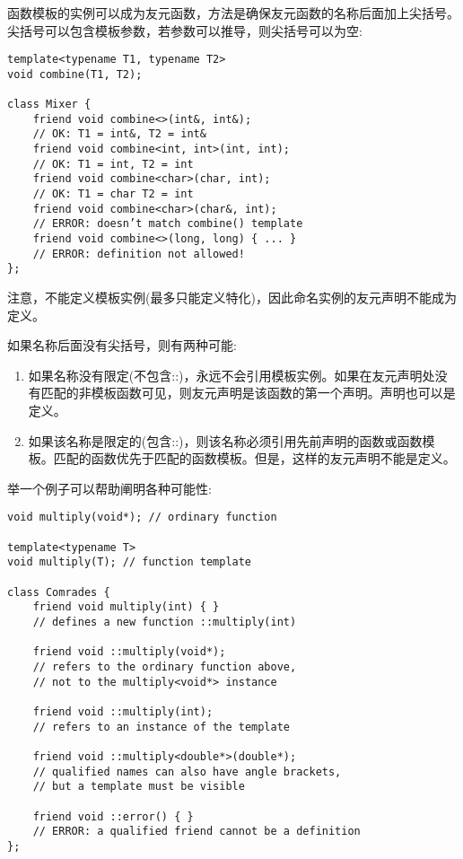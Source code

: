 函数模板的实例可以成为友元函数，方法是确保友元函数的名称后面加上尖括号。尖括号可以包含模板参数，若参数可以推导，则尖括号可以为空:

\begin{lstlisting}[style=styleCXX]
template<typename T1, typename T2>
void combine(T1, T2);

class Mixer {
	friend void combine<>(int&, int&);
	// OK: T1 = int&, T2 = int&
	friend void combine<int, int>(int, int);
	// OK: T1 = int, T2 = int
	friend void combine<char>(char, int);
	// OK: T1 = char T2 = int
	friend void combine<char>(char&, int);
	// ERROR: doesn’t match combine() template
	friend void combine<>(long, long) { ... }
	// ERROR: definition not allowed!
};
\end{lstlisting}

注意，不能定义模板实例(最多只能定义特化)，因此命名实例的友元声明不能成为定义。

如果名称后面没有尖括号，则有两种可能:

\begin{enumerate}
\item 
如果名称没有限定(不包含::)，永远不会引用模板实例。如果在友元声明处没有匹配的非模板函数可见，则友元声明是该函数的第一个声明。声明也可以是定义。

\item 
如果该名称是限定的(包含::)，则该名称必须引用先前声明的函数或函数模板。匹配的函数优先于匹配的函数模板。但是，这样的友元声明不能是定义。
\end{enumerate}

举一个例子可以帮助阐明各种可能性:

\begin{lstlisting}[style=styleCXX]
void multiply(void*); // ordinary function

template<typename T>
void multiply(T); // function template

class Comrades {
	friend void multiply(int) { }
	// defines a new function ::multiply(int)
	
	friend void ::multiply(void*);
	// refers to the ordinary function above,
	// not to the multiply<void*> instance
	
	friend void ::multiply(int);
	// refers to an instance of the template
	
	friend void ::multiply<double*>(double*);
	// qualified names can also have angle brackets,
	// but a template must be visible
	
	friend void ::error() { }
	// ERROR: a qualified friend cannot be a definition
};
\end{lstlisting}

